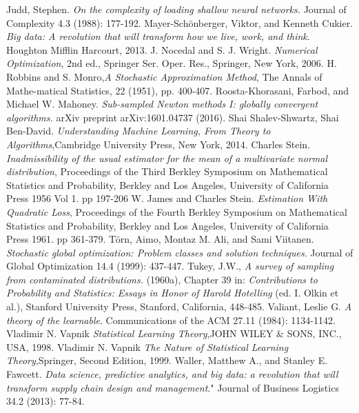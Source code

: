 \documentclass{book}
\theoremstyle{plain}
\theoremstyle{definition}
\theoremstyle{remark}
\begin{document}
\begin{thebibliography}{9}
Judd, Stephen. \emph{On the complexity of loading shallow neural networks.} Journal of Complexity 4.3 (1988): 177-192.
 Mayer-Schönberger, Viktor, and Kenneth Cukier. \emph{Big data: A revolution that will transform how we live, work, and think}. Houghton Mifflin Harcourt, 2013.
 J. Nocedal and S. J. Wright. \emph{Numerical Optimization}, 2nd ed., Springer Ser. Oper. Res., Springer, New York, 2006.
H. Robbins and S. Monro,\emph{A  Stochastic  Approximation  Method}, The Annals of Mathe-matical Statistics, 22 (1951), pp. 400-407.
Roosta-Khorasani, Farbod, and Michael W. Mahoney. \emph{Sub-sampled Newton methods I: globally convergent algorithms.} arXiv preprint arXiv:1601.04737 (2016).
 Shai Shalev-Shwartz, Shai Ben-David. \emph{Understanding Machine Learning, From Theory to Algorithms},Cambridge University Press, New York, 2014.
 Charles Stein. \emph{Inadmissibility of the usual estimator for the mean of a multivariate normal distribution}, Proceedings of the Third Berkley Symposium on Mathematical Statistics and Probability, Berkley and Los Angeles, University of California Press 1956 Vol 1. pp 197-206
 W. James and Charles Stein. \emph{Estimation With Quadratic Loss},  Proceedings of the Fourth Berkley Symposium on Mathematical Statistics and Probability, Berkley and Los Angeles, University of California Press 1961. pp 361-379.
 Törn, Aimo, Montaz M. Ali, and Sami Viitanen. \emph{Stochastic global optimization: Problem classes and solution techniques}. Journal of Global Optimization 14.4 (1999): 437-447.
 Tukey, J.W., \emph{A survey of sampling from contaminated distributions.} (1960a), Chapter 39 in: \emph{Contributions to Probability and Statistics: Essays in Honor of Harold Hotelling} (ed. I. Olkin et al.), Stanford University Press, Stanford, California, 448-485.
 Valiant, Leslie G. \emph{A theory of the learnable}. Communications of the ACM 27.11 (1984): 1134-1142.
 Vladimir N. Vapnik  \emph{Statistical Learning Theory},JOHN WILEY \& SONS, INC., USA, 1998.
 Vladimir N. Vapnik  \emph{The Nature of Statistical Learning Theory},Springer, Second Edition, 1999.
 Waller, Matthew A., and Stanley E. Fawcett. \emph{Data science, predictive analytics, and big data: a revolution that will transform supply chain design and management}." Journal of Business Logistics 34.2 (2013): 77-84.

\end{thebibliography}
\end{document}
